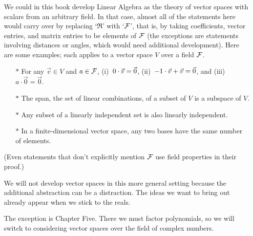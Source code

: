 We could in this book develop Linear Algebra as the theory of
vector spaces with scalars from an arbitrary field.
In that case, 
almost all of the statements here would carry over by replacing
`\( \Re \)' with `\( \mathcal{F} \)', that is, by
taking coefficients, vector entries,
and matrix entries to be elements of \( \mathcal{F} \)
(the exceptions are statements involving distances or angles,
which would need additional development).
Here are some examples; each applies to a vector space \( V \)
over a field \( \mathcal{F} \).
\begin{itemize}
  \item[$*$] For any \( \vec{v}\in V \) and \( a\in\mathcal{F} \),
  (i)~\( 0\cdot\vec{v}=\vec{0} \),
  (ii)~\( -1\cdot\vec{v}+\vec{v}=\vec{0} \),
  and (iii)~\( a\cdot\vec{0}=\vec{0} \).

  \item[$*$] The span, the set of linear combinations, of a subset of \( V \)
  is a subspace of \( V \).

  \item[$*$] Any subset of a linearly independent set is also 
     linearly independent.

  \item[$*$] In a finite-dimensional vector space, 
    any two bases have the same number of elements.
\end{itemize}
(Even statements that don't explicitly mention \( \mathcal{F} \) use
field properties in their proof.)

We will not develop vector spaces in this more general setting because
the additional abstraction can be a distraction.
The ideas we want to bring out already appear when we stick to the reals.

The exception is Chapter Five.
There we must factor polynomials,
so we will switch to considering vector spaces over the
field of complex numbers.


